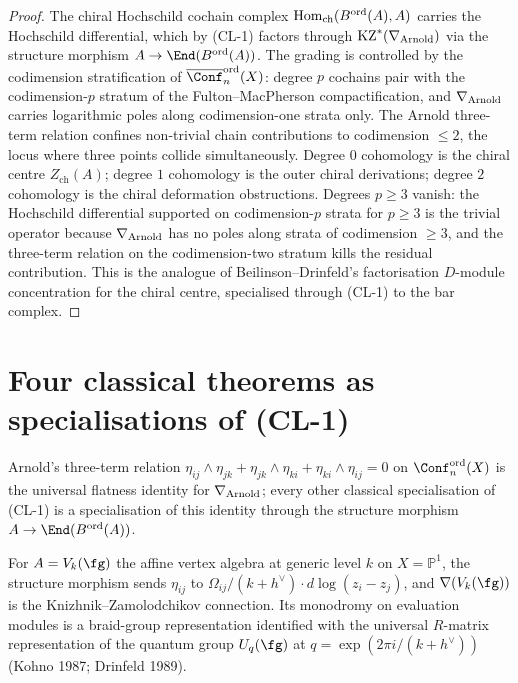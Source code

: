 \begin{proof}
The chiral Hochschild cochain complex
\(\mathrm{Hom}_{\mathrm{ch}}(B^{\mathrm{ord}}(A), A)\) carries the Hochschild differential,
which by \textup{(CL-1)} factors through \(\mathrm{KZ}^{*}(\nabla_{\mathrm{Arnold}})\) via the
structure morphism \(A \to \End(\Bord(A))\). The grading is controlled
by the codimension stratification of
\(\overline{\Conf}_{n}^{\mathrm{ord}}(X)\): degree \(p\) cochains pair
with the codimension-\(p\) stratum of the Fulton--MacPherson
compactification, and \(\nabla_{\mathrm{Arnold}}\) carries logarithmic poles along
codimension-one strata only. The Arnold three-term relation confines
non-trivial chain contributions to codimension \(\leq 2\), the locus
where three points collide simultaneously. Degree \(0\) cohomology is
the chiral centre \(Z_{\mathrm{ch}}(A)\); degree \(1\) cohomology is
the outer chiral derivations; degree \(2\) cohomology is the chiral
deformation obstructions. Degrees \(p \geq 3\) vanish: the
Hochschild differential supported on codimension-\(p\) strata
for \(p \geq 3\) is the trivial operator because \(\nabla_{\mathrm{Arnold}}\) has no
poles along strata of codimension \(\geq 3\), and the three-term
relation on the codimension-two stratum kills the residual contribution.
This is the analogue of Beilinson--Drinfeld's factorisation
\(D\)-module concentration for the chiral centre, specialised through
(CL-1) to the bar complex.
\end{proof}

\section{Four classical theorems as specialisations of (CL-1)}
\label{sec:climax-classical-specialisations}

\begin{corollary}
\label{cor:arnold-as-generating-climax}
\ClaimStatusProvedHere
Arnold's three-term relation
\(\eta_{ij}\wedge\eta_{jk} + \eta_{jk}\wedge\eta_{ki} + \eta_{ki}\wedge\eta_{ij} = 0\)
on \(\Conf_{n}^{\mathrm{ord}}(X)\) is the universal flatness identity
for \(\nabla_{\mathrm{Arnold}}\); every other classical specialisation of \textup{(CL-1)}
is a specialisation of this identity through the structure morphism
\(A \to \End(\Bord(A))\).
\end{corollary}

\begin{corollary}
\label{cor:dk-as-climax}
\ClaimStatusProvedHere
For \(A = V_{k}(\fg)\) the affine vertex algebra at generic level \(k\)
on \(X = \mathbb{P}^{1}\), the structure morphism sends \(\eta_{ij}\)
to \(\Omega_{ij}/(k+h^{\vee}) \cdot d\log(z_{i}-z_{j})\), and
\(\nabla(V_{k}(\fg))\) is the Knizhnik--Zamolodchikov connection. Its
monodromy on evaluation modules is a braid-group representation
identified with the universal \(R\)-matrix representation of the
quantum group \(U_{q}(\fg)\) at
\(q = \exp(2\pi i/(k+h^{\vee}))\) (Kohno 1987; Drinfeld 1989).
\end{corollary}

